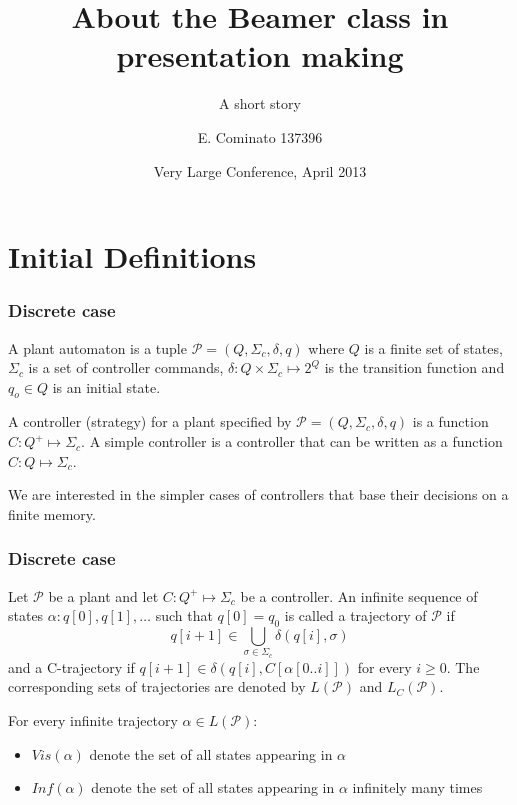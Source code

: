 \documentclass[table]{beamer}
\title[About Beamer] %
{About the Beamer class in presentation making}
\subtitle{A short story}
\author[Enrico] %
{E. Cominato 137396\inst{1}}
\institute %
{
	\inst{1}%
	Dipartimento di Scienze Matematiche, Informatiche e Fisiche\\
	Università degli studi di Udine
}
\date[VLC 2013] %
{Very Large Conference, April 2013}
\begin{document}
\frame{\titlepage}

\section{Initial Definitions}
\newcommand{\Plant}{\ensuremath{\mathcal{P}=(Q,\Sigma_c,\delta, q)}}
\newcommand{\Controller}{\ensuremath{C:Q^+\longmapsto \Sigma_c}}
\newcommand{\AccpCond}{\ensuremath{\{(F,\square),(F,\Diamond ),(F,\Diamond\square),(F,\square\Diamond),(\mathcal{F},\mathcal{R}_n)\}}}
\newcommand{\Synth}{\ensuremath{\textbf{Synth}(\mathcal{P},\Omega)}}
\begin{frame}
	\frametitle{Discrete case}
	\begin{dfn}[Plant]
		A plant automaton is a tuple $\Plant$ where
		$Q$ is a finite set of states, $\Sigma_c$ is a set of controller commands, 
		$\delta:Q \times \Sigma_c \longmapsto 2^Q$ is the transition function and 
		$q_o \in Q$ is an initial state.
	\end{dfn}

	\begin{dfn}[Controllers]
		A controller (strategy) for a plant specified by $\Plant$ 
		is a function $\Controller$. A simple controller is a controller that 
		can be written as a function $C:Q \longmapsto \Sigma_c$.
	\end{dfn}
	We are interested in the simpler cases of controllers that base their decisions on a finite memory.
\end{frame}

\begin{frame}
	\frametitle{Discrete case}
	\begin{dfn}[Trajectories]
		Let $\mathcal{P}$ be a plant and let $\Controller$ be a controller. 
		An infinite sequence of states $\alpha:q[0],q[1],\ldots$ such that
		 $q[0]=q_0$ is called a trajectory of $\mathcal{P}$ if 
		$$q[i+1] \in \bigcup_{\sigma \in \Sigma_c}\delta(q[i],\sigma)$$
		and a C-trajectory if $q[i+1] \in \delta(q[i],C[\alpha[0..i]])$ for every $i\geq 0$.
		The corresponding sets of trajectories are denoted by $L(\mathcal{P})$ and $L_C(\mathcal{P})$.
	\end{dfn}
\end{frame}

\begin{frame}
	For every infinite trajectory $\alpha \in L(\mathcal{P})$:
	\begin{itemize}
		\item $Vis(\alpha)$ denote the set of all states appearing in $\alpha$
		\item $Inf(\alpha)$ denote the set of all states appearing in $\alpha$ infinitely many times
	\end{itemize}
\end{frame}
\end{document}
